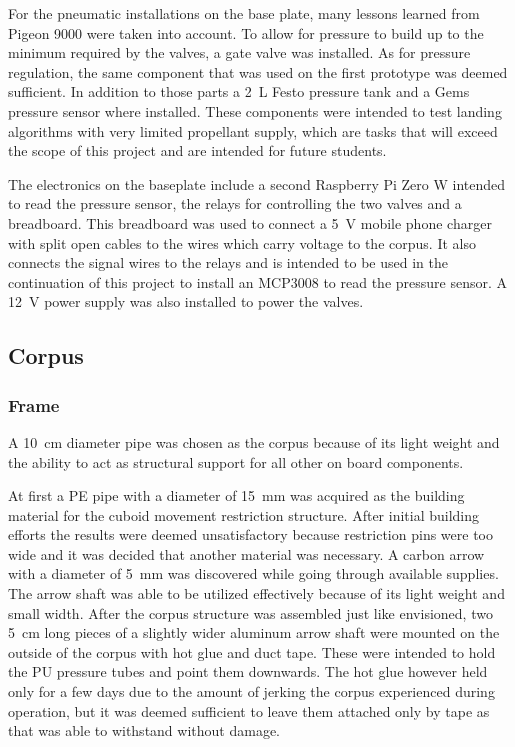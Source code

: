 For the pneumatic installations on the base plate, many lessons learned from Pigeon 9000 were taken into account. To allow for pressure to build up to the minimum required by the valves, a gate valve was installed. As for pressure regulation, the same component that was used on the first prototype was deemed sufficient. In addition to those parts a \SI{2}{\liter} Festo pressure tank\cite{pressure-tank} and a Gems pressure sensor\cite{pressure-sensor} where installed. These components were intended to test landing algorithms with very limited propellant supply, which are tasks that will exceed the scope of this project and are intended for future students.

The electronics on the baseplate include a second Raspberry Pi Zero W intended to read the pressure sensor, the relays for controlling the two valves and a breadboard. This breadboard was used to connect a \SI{5}{\volt} mobile phone charger with split open cables to the wires which carry voltage to the corpus. It also connects the signal wires to the relays and is intended to be used in the continuation of this project to install an MCP3008 to read the pressure sensor. A \SI{12}{\volt} power supply was also installed to power the valves.


\subsection{Corpus}

\subsubsection{Frame}

A \SI{10}{\centi\meter} diameter pipe was chosen as the corpus because of its light weight and the ability to act as structural support for all other on board components.%

At first a PE pipe with a diameter of \SI{15}{\milli\meter} was acquired as the building material for the cuboid movement restriction structure. After initial building efforts the results were deemed unsatisfactory because restriction pins were too wide and it was decided that another material was necessary. A carbon arrow with a diameter of \SI{5}{\milli\meter} was discovered while going through available supplies. The arrow shaft was able to be utilized effectively because of its light weight and small width. After the corpus structure was assembled just like envisioned, two \SI{5}{\centi\meter} long pieces of a slightly wider aluminum arrow shaft were mounted on the outside of the corpus with hot glue and duct tape. These were intended to hold the PU pressure tubes and point them downwards. The hot glue however held only for a few days due to the amount of jerking the corpus experienced during operation, but it was deemed sufficient to leave them attached only by tape as that was able to withstand without damage. 


